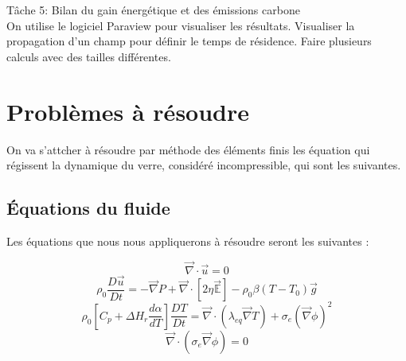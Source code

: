 \documentclass[12pt, a4paper, french, BCOR = 0pt, DIV = 10]{scrartcl}
\begin{document}
    
    Tâche 5: Bilan du gain énergétique et des émissions carbone \\
    
    
    On  utilise le logiciel Paraview pour visualiser les résultats.
    Visualiser la propagation d'un champ pour définir le temps de résidence.
    Faire plusieurs calculs avec des tailles différentes.
    
    \section{Problèmes à résoudre}
    On va s'attcher à résoudre par méthode des éléments finis les équation qui régissent la dynamique du verre, considéré incompressible, qui sont les suivantes.
    
    \subsection{Équations du fluide}
    Les équations que nous nous appliquerons à résoudre seront les suivantes :

    \begin{figure}[H]
        \centering
        \begin{equation}
            \vec {\nabla} \cdot \vec{u} = 0
            \tag{Conservation de la masse}
            \label{eq:ConsMasse}
        \end{equation}
        \begin{equation}
            \rho_{0} \frac{D\vec{u}}{Dt} = - \vec {\nabla} P + \vec {\nabla} \cdot [ 2 \eta \vec{\mathbb{E}}] - \rho_{0} \beta (T-T_{0}) \vec{g}
            \tag{Conservation de la quantité de mouvement}
            \label{eq:ConsQteMvt}
        \end{equation}
        \begin{equation}
            \rho_{0} \left[ C_{p}+ \Delta H_{r} \frac{d\alpha}{dT} \right] \frac{DT}{Dt} = \vec {\nabla} \cdot  (\lambda_{eq} \vec{\nabla} T ) + \sigma_{e} (\vec \nabla\phi)^2
            \tag{Conservation de l'enthalpie}
            \label{eq:ConsEnth}
        \end{equation}
        \begin{equation}
            \vec{\nabla} \cdot (\sigma_{e} \vec{\nabla} \phi) = 0
            \tag{Conservation du flux électrique}
            \label{eq:ConsFluxElec}
        \end{equation}
        
    \end{figure}
\end{document}
